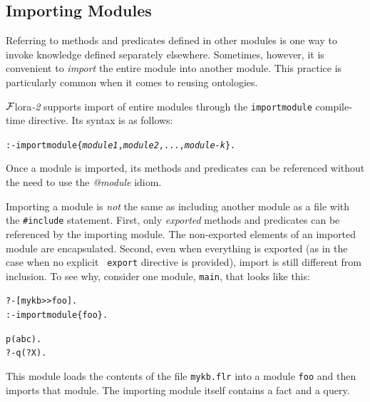 \documentclass[11pt]{article}
\newcommand{\FLORA}{{\mbox{\sc ${\cal F}${lora}\rm\emph{-2}}}\xspace}
\newcommand{\FLSYSTEM}{\FLORA}
\newcommand{\flrext}{flr\xspace}
\begin{document}
\subsection{Importing Modules}\label{sec-module-import}

Referring to methods and predicates defined in other modules is one way to
invoke knowledge defined separately elsewhere. Sometimes, however,
it is convenient to \emph{import} the entire module into another module.
This practice is particularly common when it comes to reusing ontologies.

\FLSYSTEM supports import of entire modules through the {\tt importmodule}
compile-time directive. Its syntax is as follows:

\begin{alltt}
 :- importmodule\{\textit{module1}, \textit{module2}, ..., \textit{module-k}\}.
\end{alltt}

Once a module is imported, its methods and predicates can be referenced
without the need to use the \emph{@module} idiom. 

Importing a module is \emph{not} the same as including another module as a
file with the {\tt \#include} statement. First, only \emph{exported}
methods and predicates can be referenced by the importing module.
The non-exported elements of an imported module are encapsulated.
Second,
even when everything is exported (as in the case when no explicit {\tt
  export} directive is provided), import is still different from inclusion.
To see why, consider one module, {\tt main}, that looks like this:

\begin{alltt}
  ?- [mykb>{}>foo].
  :- importmodule\{foo\}.

  p(abc).
  ?- q(?X).
\end{alltt}
This module loads the contents of the file {\tt mykb.\flrext} into a module
{\tt foo} and then imports that module.  
The importing module itself contains a fact and a query.
\end{document}
